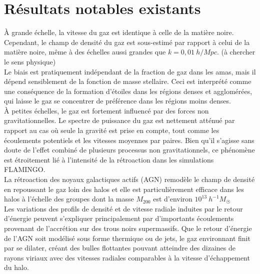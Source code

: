 \documentclass[a4paper, french, 11 pt]{article}
\begin{document}
\section{Résultats notables existants}
À grande échelle, la vitesse du gaz est identique à celle de la
matière noire. Cependant, le champ de densité du gaz est sous-estimé par rapport à celui de la matière noire, même à des échelles aussi grandes que $k = 0,01\ \unit{h/Mpc}$. (à chercher le sens physique)\\
Le biais est pratiquement indépendant de la fraction de gaz dans les amas, mais il dépend sensiblement de la fonction de masse stellaire. Ceci est interprété comme une conséquence de la formation d'étoiles dans les régions denses et agglomérées, qui laisse le gaz se concentrer de préférence dans les régions moins denses.\\
À petites échelles, le gaz est fortement influencé par des forces non gravitationnelles.
Le spectre de puissance du gaz est nettement atténué par rapport au cas où seule la gravité est prise en compte, tout comme les écoulements potentiels et les vitesses moyennes par paires. Bien qu'il s'agisse sans doute de l'effet combiné de plusieurs processus non gravitationnels, ce phénomène est étroitement lié à l'intensité de la rétroaction dans les simulations FLAMINGO.\\
La rétroaction des noyaux galactiques actifs (AGN) remodèle le champ de densité en repoussant le gaz loin des halos et elle est particulièrement efficace dans les halos à l'échelle des groupes dont la masse $M_{200}$ est d'environ $10^{13}\ \unit{h^{-1} M_{\Sun}}$\\
Les variations des profils de densité et de vitesse radiale induites par le retour d'énergie peuvent s'expliquer principalement par d'importants écoulements provenant de l'accrétion sur des trous noirs supermassifs. Que le retour d'énergie de l'AGN soit modélisé sous forme thermique ou de jets, le gaz environnant finit par se dilater, créant des bulles flottantes pouvant atteindre des dizaines de rayons viriaux avec des vitesses radiales comparables à la vitesse d'échappement du halo. \cite{Ondaro_Mallea_2025}\\
\medskip
\printbibliography[
title={Références}
]
\end{document}

